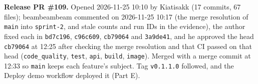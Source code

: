 \textbf{Release PR \#109.} Opened 2026-11-25 10:10 by Kiatisakk (17 commits, 67 files); beambeambeam commented on 2026-11-25 10:17 (the merge resolution of \texttt{main} into \texttt{sprint-2}, and stale counts and run IDs in the evidence), the author fixed each in \texttt{bd7c196}, \texttt{c96c609}, \texttt{cb79064} and \texttt{3a9de41}, and he approved the head \texttt{cb79064} at 12:25 after checking the merge resolution and that CI passed on that head (\texttt{code\_quality}, \texttt{test}, \texttt{api}, \texttt{build}, \texttt{image}). Merged with a merge commit at 12:33 so \texttt{main} keeps each feature's subject. Tag \texttt{v0.1.1.0} followed, and the Deploy demo workflow deployed it (Part E).

